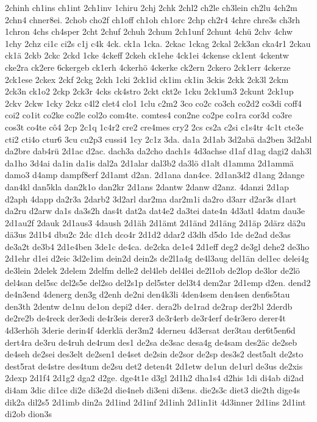 {2chinh
ch1ins
ch1int
2ch1inv
1chiru
2chj
2chk
2chl2
ch2le
ch3lein
ch2lu
4ch2m
2chn4
chner8ei.
2chob
cho2f
ch1off
ch1oh
ch1orc
2chp
ch2r4
4chre
chre3s
ch3rh
1chron
4chs
ch4sper
2cht
2chuf
2chuh
2chum
2ch1unf
2chunt
4chü
2chv
4chw
1chy
2chz
ci1c
ci2s
c1j
c4k
4ck.
ck1a
1cka.
2ckac
1ckag
2ckal
2ck3an
cka4r1
2ckau
ck1ä
2ckb
2ckc
2ckd
1cke
4ckeff
2ckeh
ck1ehe
4ck1ei
4ckense
ck1ent
4ckentw
cke2ra
ck2ere
6ckergeb
ck1erh
4ckerhö
4ckerke
ck2ern
2ckero
2ck1err
4ckerze
2ck1ese
2ckex
2ckf
2ckg
2ckh
1cki
2ck1id
ck1im
ck1in
3ckis
2ckk
2ck3l
2ckm
2ck3n
ck1o2
2ckp
2ck3r
4cks
ck4stro
2ckt
ckt2e
1cku
2ck1um3
2ckunt
2ck1up
2ckv
2ckw
1cky
2ckz
c4l2
clet4
clo1
1clu
c2m2
3co
co2c
co3ch
co2d2
co3di
coff4
coi2
co1it
co2ke
co2le
col2o
com4te.
comtes4
con2ne
co2pe
co1ra
cor3d
co3re
cos3t
co4te
cô4
2cp
2c1q
1c4r2
cre2
cre4mes
cry2
2cs
cs2a
c2si
c1s4tr
4c1t
cte3e
cti2
cti4o
ctur6
3cu
cu2p3
cussi4
1cy
2c1z
3da.
da1a
2d1ab
3d2abä
da2ben
3d2abl
da2bre
dab4rü
2d1ac
d2ac.
dach3a
da2cho
dach1s
4d3achse
d1af
d1ag
dagi2
dah3l
da1ho
3d4ai
da1in
da1is
dal2a
2d1alar
dal3b2
da3lö
d1alt
d1amma
2d1ammä
damo3
d4amp
dampf8erf
2d1amt
d2an.
2d1ana
dan4ce.
2d1an3d2
d1ang
2dange
dan4kl
dan5kla
dan2k1o
dan2kr
2d1ans
2dantw
2danw
d2anz.
4danzi
2d1ap
d2aph
4dapp
da2r3a
2darb2
3d2arl
dar2ma
dar2m1i
da2ro
d3arr
d2ar3s
d1art
da2ru
d2arw
da1s
da3s2h
das4t
dat2a
dat4e2
da3tei
date4n
4d3atl
4datm
dau3e
2d1au2f
2dauk
2d1aus3
4daush
2d1äh
2d1ämt
2d1änd
2d1äng
2d1äp
2därz
dä2u
dä3us
2d1b4
dbu2c
2dc
d1ch
dco4r
2d1d2
ddar2
d3dh
d5do
1de
de2ad
de3as
de3a2t
de3b4
2d1e4ben
3de1c
de4ca.
de2cka
de1e4
2d1eff
deg2
de3gl
dehe2
de3ho
2d1ehr
d1ei
d2eic
3d2e1im
dein2d
dein2s
de2l1a4g
de4l3aug
del1än
del1ec
delei4g
de3lein
2delek
2delem
2delfm
delle2
del4leb
del4lei
de2l1ob
de2lop
de3lor
de2lö
del4san
del5sc
del2s5e
del2so
del2s1p
del5ster
del3t4
dem2ar
2d1emp
d2en.
dend2
de4n3end
4denerg
den3g
d2enh
de2ni
den4k3li
4den4sem
den4sen
den6s5tau
den3th
2dentw
de1nu
de1on
depi2
d4er.
dera2b
de1rad
de2rap
der2bl
2derdb
de2re2b
de4reck
der3edi
de4r3eis
derer3
de3r4erb
de3r4erf
de4r3ero
derer4t
4d3erhöh
3derie
derin4f
4derklä
der3m2
4derneu
4d3ersat
der3tau
der6t5en6d
dert4ra
de3ru
de4ruh
de4rum
des1
de2sa
de3sac
desa4g
de4sam
des2äc
de2seb
de4seh
de2sei
des3elt
de2sen1
de4set
de2sin
de2sor
de2sp
des3s2
dest5alt
de2sto
dest5rat
de4stre
des4tum
de2su
det2
deten4t
2d1etw
de1un
de1url
de3us
de2xis
2dexp
2d1f4
2d1g2
dga2
d2ge.
dge4t1e
d3gl
2d1h2
dha1s4
d2his
1di
di4ab
di2ad
di4am
3dic
di1ce
di2e
di3e2d
die4neb
di3eni
di3ens.
die2s3c
diet3
die2th
dige4s
dik2a
dil2s5
2d1imb
din2a
2d1ind
2d1inf
2d1inh
2d1in1it
4d3inner
2d1ins
2d1int
di2ob
dion3s
}
